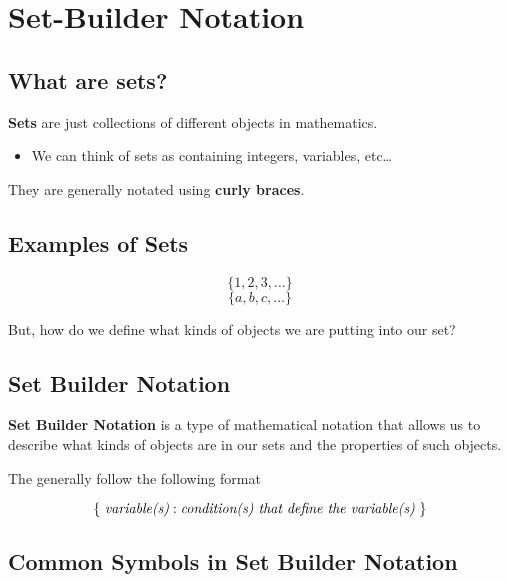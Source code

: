 \documentclass{report}
\newtheorem{plain}{Symbol}
\begin{document}
\begin{sloppypar}
\section{Set-Builder Notation}
\subsection{What are sets?}
\textbf{Sets} are just collections of different
objects in mathematics.
\begin{itemize}
  \item We can think of sets as
        containing integers, variables,
        etc\dots
\end{itemize}
They are generally notated using \textbf{curly
  braces}.
\subsection{Examples of Sets}
\[ \{ 1, 2, 3, \dots \}\]
\[ \{ a, b, c, \dots \}\]

But, how do we define what kinds of objects we are
putting into our set?
\subsection{Set Builder Notation}
\textbf{Set Builder Notation} is a type of
mathematical notation that allows us to describe what
kinds of objects are in our sets and the properties of
such objects.

\par The generally follow the following format

\[ \{ \textrm{
    \textit{variable(s)}}: \textrm{\textit{condition(s) that define the variable(s)} }\}\]
\subsection{Common Symbols in Set Builder Notation}
\begin{center}
\end{center}

\begin{center}
  \fbox{
    \parbox{\textwidth}{
      \begin{plain}
              \[ \in \]


\end{plain}}}
\end{center}
\end{sloppypar}
\end{document}
